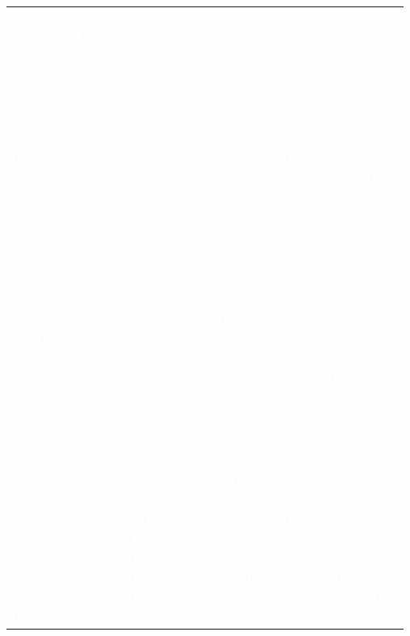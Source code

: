 \documentclass[a5paper, twoside]{article}
\begin{document}
\textcolor{white}{
  \noindent \begin{tabular}{l l l}
    Kabinet hala & 1. podlaží & Zvolská \\
    Kabinet AŠSK & 1. podlaží & Jadvidžák, Stupka \\
    Finanční účetní & 202 & Polachová \\
    Kabinet ZŘ & 203 & Sítařová \\
    Kancelář & 205 & Jemna \\
    Ředitelna & 206 & Nečas \\
    Server & 210 & Rádl \\
    Chemie & 213 & Brančová, Kyasová, Plavčanová, Vašíčková \\
    Tělená výchova & 218 & Stupka, Doležal, Liškutín, Marková D., \\
    & & Štarhová \\
    Mzdová účetní & 219 & Šuléřová \\
    Fyzika 1 & 302 & Přikryl, Glozar, Kučera, Sekerka \\
    Fyzika 2 & 303 & Lacinová, Ježek, Řehák \\
    Kabinet ZŘ & 306 & Kobza \\
    Výpočetní technika 2 & 308 & Horáková N., Hájková V., Krejčí T. \\
    Výpočetní technika 1 & 314 & Blaha, Krejčí P. \\
    Biologie & 402 & Kubištová, Kupčík, Vařejka \\
    Jazyky 1 & 406 & Zvolská, Chovancová, Literáková \\
    Matematika & 409 & Šťastná, Boucník, Juránek, Trnka \\
    Dějepis, zeměpis & 412 & Šlesingerová, Maříková \\
    Čeština & 413 & Marková L., Mrkosová \\
    Kabinet VP & 414 & Borošová, Nováková M. \\
    Společenské vědy & 415 & Pospíšil, Bučková, Horáková J. \\
    Sklad učebnic & 417 & Horák, Zerhau \\
    Knihovna & 418 & Pleva, Hudeček, Tillová, Urban \\
    Angličtina 1 & 501 & Smělíková Pilátová, Kallus Brychová \\
    Jazyky 2 & 502 & Jugasová, Sedlinská \\
    Angličtina 2 & 503 & Kubitová, Zubíčková \\
    Výtvarná výchova & 504 & Havlíčková, Hubáček, Nobbs, O'Malley \\
    Jazyky 3 & 509 & Adámková, Clausová, Novotná, Vomelová \\
    Hudební výchova & 515 & Ambrozová, Ptáčková, Řihánková
  \end{tabular}
  }
\end{document}
